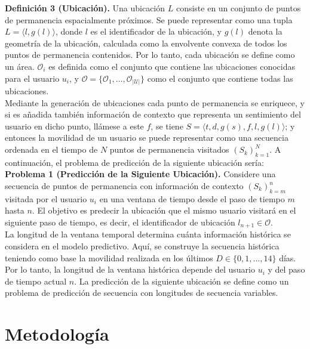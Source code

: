 \textbf{Definición 3 (Ubicación).} Una ubicación $L$ consiste en 
un conjunto de puntos de permanencia espacialmente próximos. Se 
puede representar como una tupla $L = \langle l, g(l) \rangle$, 
donde $l$ es el identificador de la ubicación, 
y $g(l)$ denota la geometría de la ubicación, calculada como la 
envolvente convexa de todos los puntos de permanencia contenidos. 
Por lo tanto, cada ubicación se define como un área. 
$\mathcal{O}_i$ es definida como el conjunto que contiene las 
ubicaciones conocidas para el usuario $u_i$, y 
$\mathcal{O} = \{\mathcal{O}_1, \dots, \mathcal{O}_{|\mathcal{U}|} \}$ 
como el conjunto que contiene todas las ubicaciones.\\


Mediante la generación de ubicaciones cada punto de permanencia 
se enriquece, y si es añadida tambi\'en información de contexto que 
representa un sentimiento del usuario en dicho punto, ll\'amese a este $f$, se tiene
$S = \langle t, d, g(s), f, l, g(l) \rangle$; y entonces la movilidad de 
un usuario se puede representar como una secuencia ordenada en 
el tiempo de $N$ puntos de permanencia visitados $(S_k)_{k=1}^N$.
A continuación, el problema de predicción de la 
siguiente ubicación ser\'ia:\\

\textbf{Problema 1 (Predicción de la Siguiente Ubicación).} 
Considere una secuencia de puntos de permanencia con información 
de contexto $(S_k)_{k=m}^n$ visitada por el usuario $u_i$ en una 
ventana de tiempo desde el paso de tiempo $m$ hasta $n$. El 
objetivo es predecir la ubicación que el mismo usuario visitará 
en el siguiente paso de tiempo, es decir, el identificador de 
ubicación $l_{n+1} \in \mathcal{O}$.\\

La longitud de la ventana temporal determina cuánta información 
histórica se considera en el modelo predictivo. Aquí, se construye 
la secuencia histórica teniendo como base la movilidad realizada en 
los últimos \(D \in \{0, 1, \dots, 14\}\) días.
Por lo tanto, la longitud de la ventana histórica depende del 
usuario \(u_i\) y del paso de tiempo actual \(n\). 
La predicción de la siguiente ubicación se define como un 
problema de predicción de secuencia con longitudes de secuencia 
variables.
\newpage
\section{Metodolog\'ia}

